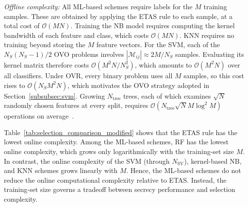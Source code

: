 {\emph{Offline complexity:} All ML-based schemes require labels for the
$M$ training samples. These are obtained by applying the ETAS rule to
each sample, at a total cost of $\mathcal{O}(MN)$. Training the NB model
requires computing the kernel bandwidth of each feature and class, which
costs $\mathcal{O}(MN)$. KNN requires no training beyond storing the $M$
feature vectors. For the SVM, each of the $N_S(N_S-1)/2$ OVO problems
involves $|\mathcal{M}_{ij}|\approx 2M/N_S$ samples. Evaluating its
kernel matrix therefore costs $\mathcal{O}(M^2N/N_S^2)$, which amounts to
$\mathcal{O}(M^2N)$ over all classifiers. Under OVR, every binary problem
uses all $M$ samples, so this cost rises to $\mathcal{O}(N_SM^2N)$, which
motivates the OVO strategy adopted in Section~\ref{subsubsec:svm}.
Growing $N_{\mathrm{tree}}$ trees, each of which examines $\sqrt{N}$ randomly chosen
features at every split, requires
$\mathcal{O}(N_{\mathrm{tree}}\sqrt{N}M\log^2M)$ operations on
average~\cite{Louppe_2014_RF}.

Table~\ref{tab:selection_comparison_modified} shows that the ETAS rule
has the lowest online complexity. Among the ML-based schemes, RF has the
lowest online complexity, which grows only logarithmically with the
training-set size $M$. In contrast, the online complexity of the SVM
(through $N_{\mathrm{SV}}$), kernel-based NB, and KNN schemes grows
linearly with $M$. Hence, the ML-based schemes do not reduce the online
computational complexity relative to ETAS. Instead, the training-set size
governs a tradeoff between secrecy performance and selection complexity.
}


